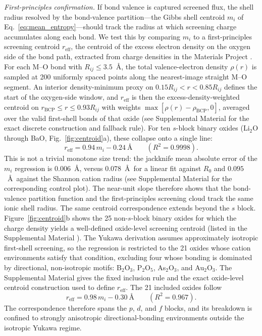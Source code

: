 \documentclass[aps,prmaterials,twocolumn,10pt,superscriptaddress,floatfix]{revtex4-2}
\newcommand{\runinsec}[1]{\medskip\emph{#1}}
\begin{document}
\runinsec{First-principles confirmation.} If bond valence is captured
screened flux, the shell radius resolved by the bond-valence
partition---the Gibbs shell centroid $m_i$ of
Eq.~\eqref{eq:mean_entropy}---should track the radius at which
screening charge accumulates along each bond.  We test this by
comparing $m_i$ to a first-principles screening centroid
$r_{\mathrm{eff}}$, the centroid of the excess electron density on
the oxygen side of the bond path, extracted from charge densities in
the Materials Project \cite{MaterialsProject,Horton2025}.  For each M--O
bond with $R_{ij}\le 3.5$~\AA, the total valence-electron density
$\rho(r)$ is sampled at 200 uniformly spaced points along the
nearest-image straight M--O segment.  An interior density-minimum proxy
on $0.15R_{ij}<r<0.85R_{ij}$ defines the start of the oxygen-side
window, and $r_{\mathrm{eff}}$ is then the excess-density-weighted centroid
on $r_{\mathrm{BCP}}\le r\le 0.93R_{ij}$ with weights
$\max[\rho(r)-\rho_{\mathrm{BCP}},0]$, averaged over the valid
first-shell bonds of that oxide (see Supplemental Material for the exact
discrete construction and fallback rule).
For ten $s$-block binary oxides (Li$_2$O through BaO,
Fig.~\ref{fig:centroid}a),
these collapse onto a single line:
\begin{equation*}
r_{\mathrm{eff}} = 0.94\,m_i - 0.24~\text{\AA}
\qquad (R^2=0.9998).
\end{equation*}
This is not a trivial monotone size trend: the jackknife
mean absolute error of the $m_i$ regression is $0.006$~\AA, versus
$0.078$~\AA\ for a linear fit against $R_0$ and $0.095$~\AA\ against the
Shannon cation radius
\cite{Shannon1976}
(see Supplemental Material for the corresponding control plot).  The near-unit slope therefore shows
that the bond-valence partition function and the first-principles screening cloud track
the same ionic shell radius.  The same centroid correspondence extends
beyond the $s$ block.
Figure~\ref{fig:centroid}b shows the 25 non-$s$-block binary oxides for
which the charge density yields a well-defined oxide-level screening centroid
(listed in the Supplemental Material \cite{suppmat}).  The Yukawa
derivation assumes approximately isotropic first-shell screening, so
the regression is restricted to the 21 oxides whose cation environments
satisfy that condition, excluding four whose bonding is dominated by
directional, non-isotropic motifs: B$_2$O$_3$, P$_2$O$_5$,
As$_2$O$_3$, and Au$_2$O$_3$.  The Supplemental Material gives the fixed
inclusion rule and the exact oxide-level centroid construction used to
define $r_{\mathrm{eff}}$.  The 21 included oxides follow
\begin{equation*}
r_{\mathrm{eff}} = 0.98\,m_i - 0.30~\text{\AA}
\qquad (R^2=0.967).
\end{equation*}
The correspondence therefore spans the $p$, $d$, and $f$ blocks, and
its breakdown is confined to strongly anisotropic directional-bonding
environments outside the isotropic Yukawa regime.
\end{document}
